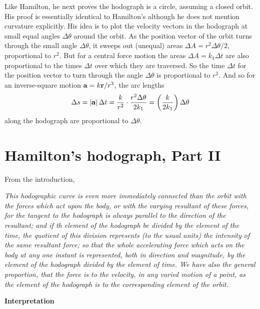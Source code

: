\documentclass{ximera}
\begin{document}
Like Hamilton, he next proves the hodograph is a circle, assuming a closed orbit. His proof is essentially identical to Hamilton's although he does not mention curvature explicitly. His idea is to plot the velocity vectors in the hodograph at small equal angles $\Delta \theta$ around the orbit. As the position vector of the orbit turns through the small angle $\Delta \theta$, it sweeps out (unequal) areas $\Delta A = r^2 \Delta \theta/2$, proportional to $r^2$. But for a central force motion the areas $\Delta A = k_1\Delta t$ are also proportional to the times $\Delta t$ over which they are traversed. So the time $\Delta t$ for the position vector to turn through the angle $\Delta \theta$ is proportional to $r^2$. And so for an inverse-square motion ${\bf a}=k{\bf r}/r^3$, the arc lengths 
\[
 \Delta s = |{\bf a}|\, \Delta t = \frac{k}{r^2} \cdot \frac{r^2 \Delta \theta}{2k_1} = \left( \frac{k}{2k_1} \right)\Delta \theta
\]
along the hodograph are proportional to $\Delta \theta$.

 

\section*{Hamilton's hodograph, Part II}

From the introduction, 

\emph{This hodographic curve is even more immediately connected than the orbit with the \emph{forces} which act upon the body, or with the varying resultant of these forces, for the tangent to the hodograph is always parallel to the direction of the resultant; and if th element of the hodograph be divided by the element of the time, the quotient of this division represents (to the usual units) the intensity of the same resultant force; so that the whole accelerating force which acts on the body at any one instant is represented, both in direction and magnitude, by the element of the hodograph divided by the element of time. We have also the general proportion, that the \emph{force is to the velocity, in any varied motion of a point, as the element of the hodograph is to the corresponding element of the orbit.}}

{\bf Interpretation}
\end{document}
